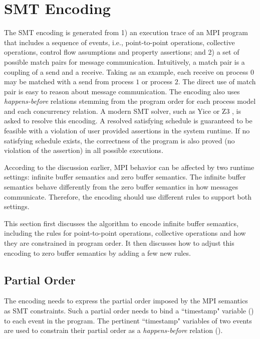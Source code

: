 \section{SMT Encoding}
The SMT encoding is generated from 1) an execution trace of an MPI program that includes a sequence of events, i.e., point-to-point operations, collective operations, control flow assumptions and property assertions; and 2) a set of possible match pairs for message communication. Intuitively, a match pair is a coupling of a send and a receive. Taking  as an example, each receive on process $0$ may be matched with a send from process $1$ or process $2$. The direct use of match pair is easy to reason about message communication. The encoding also uses \textit{happens-before} relations stemming from the program order for each process model and each concurrency relation. A modern SMT solver, such as Yice \cite{dutertre:CAV06} or Z3 \cite{demoura:tacas08}, is asked to resolve this encoding. A resolved satisfying schedule is guaranteed to be feasible with a violation of user provided assertions in the system runtime. If no satisfying schedule exists, the correctness of the program is also proved (no violation of the assertion) in all possible executions. 

According to the discussion earlier, MPI behavior can be affected by two runtime settings: infinite buffer semantics and zero buffer semantics. The infinite buffer semantics behave differently from the zero buffer semantics in how messages communicate. Therefore, the encoding should use different rules to support both settings. 

This section first discusses the algorithm to encode infinite buffer semantics, including the rules for point-to-point operations, collective operations and how they are constrained in program order. It then discusses how to adjust this encoding to zero buffer semantics by adding a few new rules.

\subsection{Partial Order}
The encoding needs to express the partial order imposed by the MPI semantics as SMT constraints. Such a partial order needs to bind a ``timestamp" variable () to each event in the program. The pertinent ``timestamp" variables of two events are used to constrain their partial order as a \emph{happens-before} relation ().

